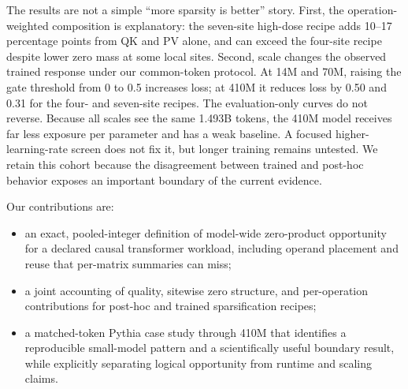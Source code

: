 The results are not a simple ``more sparsity is better'' story.  First, the
operation-weighted composition is explanatory: the seven-site high-dose recipe
adds 10--17 percentage points from QK and PV alone, and can exceed the
four-site recipe despite lower zero mass at some local sites.  Second, scale
changes the observed trained response under our common-token protocol.  At 14M
and 70M, raising the gate threshold from 0 to 0.5 increases loss; at 410M it
reduces loss by 0.50 and 0.31 for the four- and seven-site recipes.  The
evaluation-only curves do not reverse.  Because all scales see the same 1.493B
tokens, the 410M model receives far less exposure per parameter and has a weak
baseline.  A focused higher-learning-rate screen does not fix it, but longer
training remains untested.  We retain this cohort because the disagreement
between trained and post-hoc behavior exposes an important boundary of the
current evidence.

Our contributions are:
\begin{itemize}[leftmargin=*,nosep]
  \item an exact, pooled-integer definition of model-wide zero-product
  opportunity for a declared causal transformer workload, including operand
  placement and reuse that per-matrix summaries can miss;
  \item a joint accounting of quality, sitewise zero structure, and
  per-operation contributions for post-hoc and trained sparsification recipes;
  \item a matched-token Pythia case study through 410M that identifies a
  reproducible small-model pattern and a scientifically useful boundary result,
  while explicitly separating logical opportunity from runtime and scaling
  claims.
\end{itemize}

